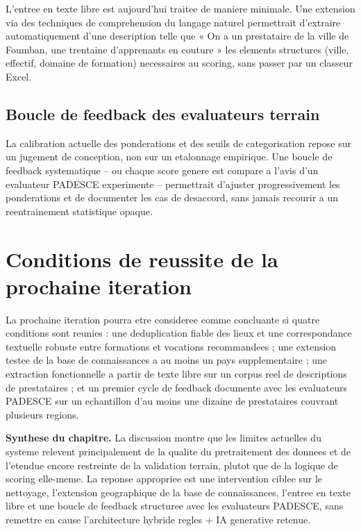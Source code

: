 \documentclass[12pt,a4paper,twoside,openany]{report}
\begin{document}
L'entree en texte libre est aujourd'hui traitee de maniere minimale. Une extension via des techniques de comprehension du langage naturel permettrait d'extraire automatiquement d'une description telle que « On a un prestataire de la ville de Foumban, une trentaine d'apprenants en couture » les elements structures (ville, effectif, domaine de formation) necessaires au scoring, sans passer par un classeur Excel.

\subsection{Boucle de feedback des evaluateurs terrain}

La calibration actuelle des ponderations et des seuils de categorisation repose sur un jugement de conception, non sur un etalonnage empirique. Une boucle de feedback systematique -- ou chaque score genere est compare a l'avis d'un evaluateur PADESCE experimente -- permettrait d'ajuster progressivement les ponderations et de documenter les cas de desaccord, sans jamais recourir a un reentrainement statistique opaque.

\section{Conditions de reussite de la prochaine iteration}

La prochaine iteration pourra etre consideree comme concluante si quatre conditions sont reunies : une deduplication fiable des lieux et une correspondance textuelle robuste entre formations et vocations recommandees ; une extension testee de la base de connaissances a au moins un pays supplementaire ; une extraction fonctionnelle a partir de texte libre sur un corpus reel de descriptions de prestataires ; et un premier cycle de feedback documente avec les evaluateurs PADESCE sur un echantillon d'au moins une dizaine de prestataires couvrant plusieurs regions.

\textbf{Synthese du chapitre.} La discussion montre que les limites actuelles du systeme relevent principalement de la qualite du pretraitement des donnees et de l'etendue encore restreinte de la validation terrain, plutot que de la logique de scoring elle-meme. La reponse appropriee est une intervention ciblee sur le nettoyage, l'extension geographique de la base de connaissances, l'entree en texte libre et une boucle de feedback structuree avec les evaluateurs PADESCE, sans remettre en cause l'architecture hybride regles + IA generative retenue.
\end{document}
